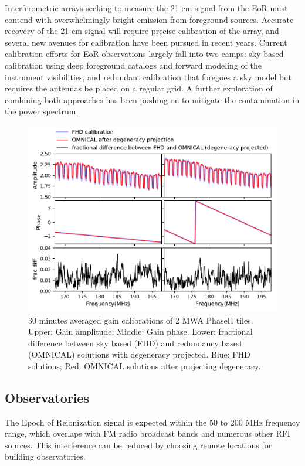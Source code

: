 \documentclass[a0,landscape]{a0poster}
\begin{document}
\begin{multicols}{4}
Interferometric arrays seeking to measure the 21 cm signal from the EoR must contend with overwhelmingly bright emission from foreground sources. Accurate recovery of the 21 cm signal will require precise calibration of the array, and several new avenues for calibration have been pursued in recent years. Current calibration efforts for EoR observations largely fall into two camps:  sky-based calibration using deep foreground catalogs and forward modeling of the instrument visibilities, and redundant calibration that foregoes a sky model but requires the antennas be placed on a regular grid. A further exploration of combining both approaches has been pushing on to mitigate the contamination in the power spectrum.
\begin{figure}[H]
\centering
\label{comparison_between_sky_and_redundant}
\includegraphics[width=0.75\linewidth]{figures/projtest2.pdf}
\caption{30 minutes averaged gain calibrations of 2 MWA PhaseII tiles. Upper: Gain amplitude; Middle: Gain phase. Lower: fractional difference between sky based (FHD) and redundancy based (OMNICAL) solutions with degeneracy projected. Blue: FHD solutions; Red: OMNICAL solutions after projecting degeneracy.}
\end{figure}


\subsection*{Observatories}

The Epoch of Reionization signal is expected within the 50 to 200 MHz frequency range, which overlaps with FM radio broadcast bands and numerous other RFI sources. This interference can be reduced by choosing remote locations for building observatories.


\end{multicols}
\end{document}
